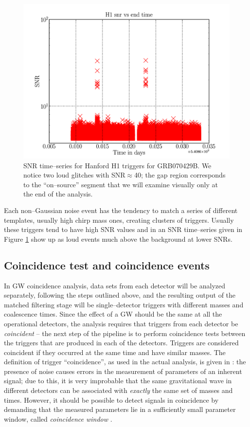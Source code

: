 \begin{figure}[ht!]
\centering
\includegraphics[scale=0.30]{Images/H1_SNR_time.png}
\caption{SNR time--series for Hanford H1 triggers for GRB070429B. We notice two loud glitches with SNR$\approx$40; the gap region corresponds to the ``on--source'' segment that we will examine visually only at the end of the analysis.}
\label{H1snr}
\end{figure}

Each non--Gaussian noise event has the tendency to match a series of different templates, usually high chirp mass ones, creating clusters of triggers. Usually these triggers tend to have high SNR values and in an SNR time--series given in Figure \ref{H1snr} show up as loud events much above the background at lower SNRs.

\subsection{Coincidence test and coincidence events}
\label{grb070429bcoincidence}
In GW coincidence analysis, data sets from each detector will be analyzed separately, following the steps outlined above, and the resulting output of the matched filtering stage will be single--detector triggers with different masses and coalescence times. Since the effect of a GW should be the same at all the operational detectors, the analysis requires that triggers from each detector be \emph{coincident} -- the next step of the pipeline is to perform coincidence tests between the triggers that are produced in each of the detectors. Triggers are considered coincident if they occurred at the same time and have similar masses. The definition of trigger ``coincidence'', as used in the actual analysis, is given in \cite{Robinson:2008un}: the presence of noise causes errors in the measurement of parameters of an inherent signal; due to this, it is very improbable that the same gravitational wave in different detectors can be associated with \emph{exactly} the same set of masses and times. However, it should be possible to detect signals in coincidence by demanding that the measured parameters lie in a sufficiently small parameter window, called \emph{coincidence window} \cite{Robinson:2008un}.

